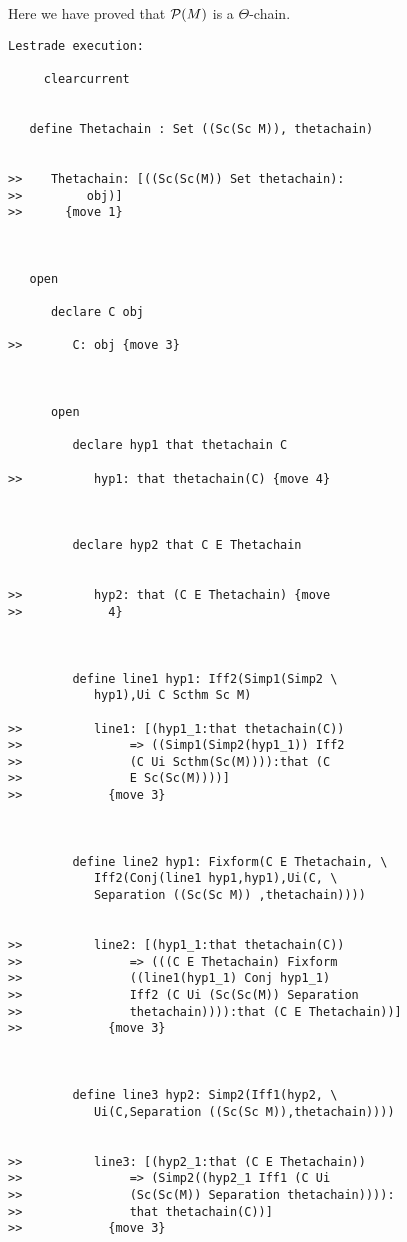 \documentclass[12pt]{article}
\begin{document}
Here we have proved that ${\cal P}(M)$ is a $\Theta$-chain.


\begin{verbatim}Lestrade execution:

     clearcurrent


   define Thetachain : Set ((Sc(Sc M)), thetachain)


>>    Thetachain: [((Sc(Sc(M)) Set thetachain):
>>         obj)]
>>      {move 1}



   open

      declare C obj

>>       C: obj {move 3}



      open

         declare hyp1 that thetachain C

>>          hyp1: that thetachain(C) {move 4}



         declare hyp2 that C E Thetachain


>>          hyp2: that (C E Thetachain) {move
>>            4}



         define line1 hyp1: Iff2(Simp1(Simp2 \
            hyp1),Ui C Scthm Sc M)

>>          line1: [(hyp1_1:that thetachain(C))
>>               => ((Simp1(Simp2(hyp1_1)) Iff2
>>               (C Ui Scthm(Sc(M)))):that (C
>>               E Sc(Sc(M))))]
>>            {move 3}



         define line2 hyp1: Fixform(C E Thetachain, \
            Iff2(Conj(line1 hyp1,hyp1),Ui(C, \
            Separation ((Sc(Sc M)) ,thetachain))))


>>          line2: [(hyp1_1:that thetachain(C))
>>               => (((C E Thetachain) Fixform
>>               ((line1(hyp1_1) Conj hyp1_1)
>>               Iff2 (C Ui (Sc(Sc(M)) Separation
>>               thetachain)))):that (C E Thetachain))]
>>            {move 3}



         define line3 hyp2: Simp2(Iff1(hyp2, \
            Ui(C,Separation ((Sc(Sc M)),thetachain))))


>>          line3: [(hyp2_1:that (C E Thetachain))
>>               => (Simp2((hyp2_1 Iff1 (C Ui
>>               (Sc(Sc(M)) Separation thetachain)))):
>>               that thetachain(C))]
>>            {move 3}




\end{verbatim}
\end{document}
